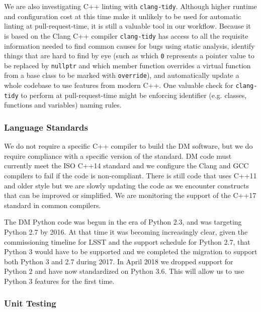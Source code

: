 We are also investigating C++ linting with \texttt{clang-tidy}\cite{clangtidy}. Although higher runtime and configuration cost at this time make it unlikely to be used for automatic linting at pull-request-time, it is still a valuable tool in our workflow.
Because it is based on the Clang C++ compiler \texttt{clang-tidy} has access to all the requisite information needed to find common causes for bugs using static analysis, identify things that are hard to find by eye (such as which \texttt{0} represents a pointer value to be replaced by \texttt{nullptr} and which member function overrides a virtual function from a base class to be marked with \texttt{override}), and automatically update a whole codebase to use features from modern C++.
One valuable check for \texttt{clang-tidy} to perform at pull-request-time might be enforcing identifier (e.g. classes, functions and variables) naming rules.

\subsubsection{Language Standards}

We do not require a specific C++ compiler to build the DM software, but we do require compliance with a specific version of the standard.
DM code must currently meet the ISO C++14 standard\cite{cpp14} and we configure the Clang and GCC compilers to fail if the code is non-compliant.
There is still code that uses C++11 and older style but we are slowly updating the code as we encounter constructs that can be improved or simplified.
We are monitoring the support of the C++17 standard in common compilers.

The DM Python code was begun in the era of Python 2.3, and was targeting Python 2.7 by 2016.
At that time it was becoming increasingly clear, given the commissioning timeline for LSST and the support schedule for Python 2.7, that Python 3 would have to be supported and we completed the migration to support both Python 3 and 2.7 during 2017\cite{2016arXiv161100751J}.
In April 2018 we dropped support for Python 2 and have now standardized on Python 3.6\cite{2017arXiv171200461J}.
This will allow us to use Python 3 features for the first time.

\subsubsection{Unit Testing}

